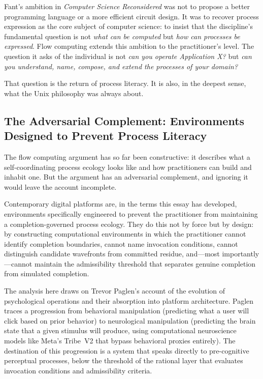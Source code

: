 \documentclass[12pt, a4paper]{article}
\begin{document}
Fant's ambition in \textit{Computer Science Reconsidered} was not
to propose a better programming language or a more efficient circuit
design. It was to recover process expression as the core subject
of computer science: to insist that the discipline's fundamental
question is not \emph{what can be computed} but \emph{how can
processes be expressed}. Flow computing extends this ambition to
the practitioner's level. The question it asks of the individual
is not \emph{can you operate Application X?} but \emph{can you
understand, name, compose, and extend the processes of your domain?}

That question is the return of process literacy. It is also, in
the deepest sense, what the Unix philosophy was always about.

\subsection{The Adversarial Complement: Environments Designed to
Prevent Process Literacy}

The flow computing argument has so far been constructive: it
describes what a self-coordinating process ecology looks like and
how practitioners can build and inhabit one. But the argument has
an adversarial complement, and ignoring it would leave the account
incomplete.

Contemporary digital platforms are, in the terms this essay has
developed, environments specifically engineered to prevent the
practitioner from maintaining a completion-governed process
ecology. They do this not by force but by design: by constructing
computational environments in which the practitioner cannot
identify completion boundaries, cannot name invocation conditions,
cannot distinguish candidate wavefronts from committed residue,
and---most importantly---cannot maintain the admissibility
threshold that separates genuine completion from simulated
completion.

The analysis here draws on Trevor Paglen's account of the
evolution of psychological operations and their absorption into
platform architecture. Paglen traces a progression from
behavioral manipulation (predicting what a user will click based
on prior behavior) to neurological manipulation (predicting the
brain state that a given stimulus will produce, using computational
neuroscience models like Meta's Tribe~V2 that bypass behavioral
proxies entirely). The destination of this progression is a
system that speaks directly to pre-cognitive perceptual processes,
below the threshold of the rational layer that evaluates
invocation conditions and admissibility criteria.
\end{document}
